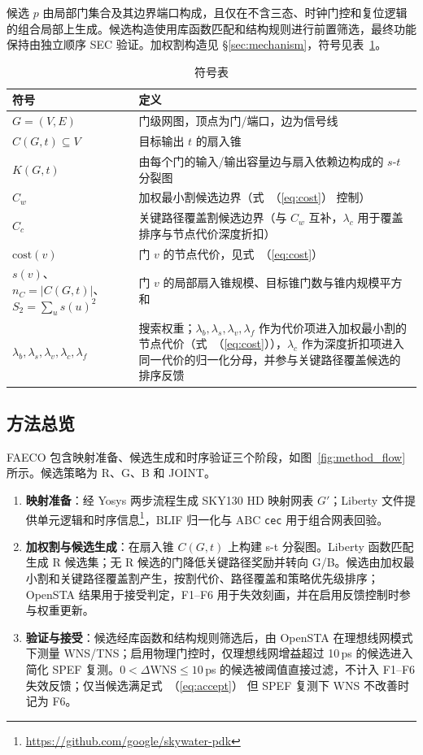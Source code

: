 \documentclass[twocolumn,10pt,fontset=windows]{ctexart}
\renewcommand{\eqref}[1]{\textup{（\ref{#1}）}}
\begin{document}
候选 $p$ 由局部门集合及其边界端口构成，且仅在不含三态、时钟门控和复位逻辑的组合局部上生成。候选构造使用库函数匹配和结构规则进行前置筛选，最终功能保持由独立顺序 SEC 验证。加权割构造见 \S\ref{sec:mechanism}，符号见表~\ref{tab:symbols}。

\begin{table}[ht]
\centering
\caption{符号表}
\label{tab:symbols}
\scriptsize
\setlength{\tabcolsep}{2pt}
\renewcommand{\arraystretch}{0.9}
\begin{tabular}{p{2.6cm}p{4.9cm}}
\toprule
\textbf{符号} & \textbf{定义} \\
\midrule
$G = (V, E)$ & 门级网图，顶点为门/端口，边为信号线 \\
$C(G, t) \subseteq V$ & 目标输出 $t$ 的扇入锥 \\
$K(G, t)$ & 由每个门的输入/输出容量边与扇入依赖边构成的 $s$-$t$ 分裂图 \\
$C_w$ & 加权最小割候选边界（式~\eqref{eq:cost} 控制） \\
$C_c$ & 关键路径覆盖割候选边界（与 $C_w$ 互补，$\lambda_c$ 用于覆盖排序与节点代价深度折扣） \\
$\mathrm{cost}(v)$ & 门 $v$ 的节点代价，见式~\eqref{eq:cost} \\
$s(v)$、$n_C=|C(G,t)|$、$S_2=\sum_u s(u)^2$ & 门 $v$ 的局部扇入锥规模、目标锥门数与锥内规模平方和 \\
$\lambda_b,\lambda_s,\lambda_v,\lambda_c,\lambda_f$ & 搜索权重；$\lambda_b,\lambda_s,\lambda_v,\lambda_f$ 作为代价项进入加权最小割的节点代价（式~\eqref{eq:cost}），$\lambda_c$ 作为深度折扣项进入同一代价的归一化分母，并参与关键路径覆盖候选的排序反馈 \\
\bottomrule
\end{tabular}
\end{table}

\subsection{方法总览}\label{sec:overview}

FAECO 包含映射准备、候选生成和时序验证三个阶段，如图~\ref{fig:method_flow} 所示。候选策略为 R、G、B 和 JOINT。

\begin{enumerate}
  \item[(a)] \textbf{映射准备}：经 Yosys 两步流程生成 SKY130 HD 映射网表 $G'$；Liberty 文件提供单元逻辑和时序信息\footnote{\url{https://github.com/google/skywater-pdk}}，BLIF 归一化与 ABC \texttt{cec}\cite{abc} 用于组合网表回验。
  \item[(b)] \textbf{加权割与候选生成}：在扇入锥 $C(G,t)$ 上构建 s-t 分裂图。Liberty 函数匹配生成 R 候选集；无 R 候选的门降低关键路径奖励并转向 G/B。候选由加权最小割和关键路径覆盖割产生，按割代价、路径覆盖和策略优先级排序；OpenSTA 结果用于接受判定，F1--F6 用于失效刻画，并在启用反馈控制时参与权重更新。
  \item[(c)] \textbf{验证与接受}：候选经库函数和结构规则筛选后，由 OpenSTA 在理想线网模式下测量 WNS/TNS；启用物理门控时，仅理想线网增益超过 10\,ps 的候选进入简化 SPEF 复测。$0<\Delta\mathrm{WNS}\le10\,$ps 的候选被阈值直接过滤，不计入 F1--F6 失效反馈；仅当候选满足式~\eqref{eq:accept} 但 SPEF 复测下 WNS 不改善时记为 F6。
\end{enumerate}
\end{document}
